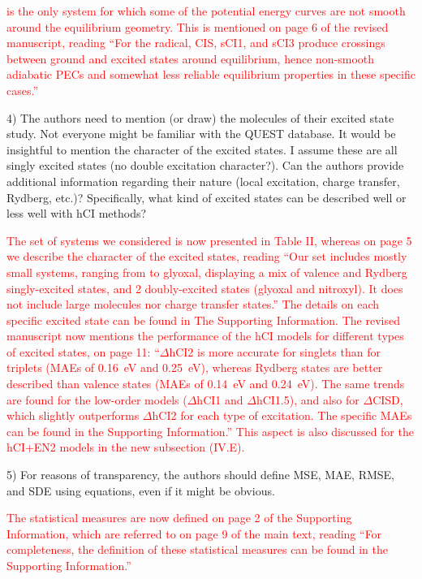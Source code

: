 \documentclass[10pt]{letter}
\newcommand{\alert}[1]{\textcolor{red}{#1}}
\begin{document}
\begin{letter}
\alert{
 is the only system for which some of the potential energy curves are not smooth around the equilibrium geometry.
This is mentioned on page 6 of the revised manuscript, reading
``For the \ce{CN} radical, CIS, sCI1, and sCI3 produce crossings between ground and excited states around equilibrium, hence non-smooth adiabatic PECs
and somewhat less reliable equilibrium properties in these specific cases.''
}

\clearpage

{4) The authors need to mention (or draw) the molecules of their excited state study. Not everyone might be familiar with the QUEST database. It would be insightful to mention the character of the excited states. I assume these are all singly excited states (no double excitation character?). Can the authors provide additional information regarding their nature (local excitation, charge transfer, Rydberg, etc.)? Specifically, what kind of excited states can be described well or less well with hCI methods?
}

\alert{
The set of systems we considered is now presented in Table II, whereas on page 5 we describe the character of the excited states, reading
``Our set includes mostly small systems, ranging from \ce{BH} to glyoxal, displaying a mix of valence and Rydberg singly-excited states,
and 2 doubly-excited states (glyoxal and nitroxyl). It does not include large molecules nor charge transfer states.''
The details on each specific excited state can be found in The Supporting Information.
The revised manuscript now mentions the performance of the hCI models for different types of excited states, on page 11:
``$\Delta$hCI2 is more accurate for singlets than for triplets (MAEs of \SI{0.16}{\eV} and \SI{0.25}{\eV}),
whereas Rydberg states are better described than valence states (MAEs of \SI{0.14}{\eV} and \SI{0.24}{\eV}).
The same trends are found for the low-order models ($\Delta$hCI1 and $\Delta$hCI1.5), and also for $\Delta$CISD, which slightly outperforms $\Delta$hCI2 for each type of excitation.
The specific MAEs can be found in the Supporting Information.''
This aspect is also discussed for the hCI+EN2 models in the new subsection (IV.E).
}

{5) For reasons of transparency, the authors should define MSE, MAE, RMSE, and SDE using equations, even if it might be obvious.
}

\alert{
The statistical measures are now defined on page 2 of the Supporting Information, which are referred to on page 9 of the main text, reading
``For completeness, the definition of these statistical measures can be found in the Supporting Information.''
}


\end{letter}
\end{document}
